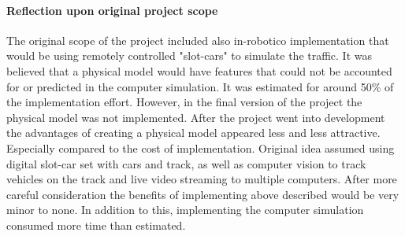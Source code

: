\documentclass[11pt,english,twoside]{article}
\begin{document}

























\paragraph{Reflection upon original project scope}

The original scope of the project included also in-robotico implementation that would be using remotely controlled "slot-cars" to simulate the traffic. It was believed that a physical model would have features that could not be accounted for or predicted in the computer simulation. It was estimated for around 50\% of the implementation effort. However, in the final version of the project the physical model was not implemented. After the project went into development the advantages of creating a physical model appeared less and less attractive. Especially compared to the cost of implementation. Original idea assumed using digital slot-car set with cars and track, as well as computer vision to track vehicles on the track and live video streaming to multiple computers. After more careful consideration the benefits of implementing above described would be very minor to none. In addition to this, implementing the computer simulation consumed more time than estimated. 
\end{document}
